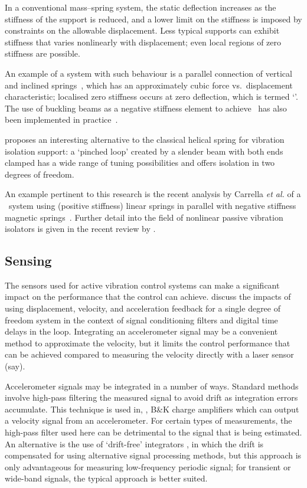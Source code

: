 In a conventional mass--spring system, the static deflection increases
as the stiffness of the support is reduced, and a lower limit on the
stiffness is imposed by constraints on the allowable
displacement. Less typical supports can exhibit stiffness that varies
nonlinearly with displacement; even local regions of zero stiffness
are possible.

An example of a system with such behaviour is a parallel
connection of vertical and inclined
springs~\cite{molyneux1957,alabuzhev1989,carrella2006,carrella2007},
which has an approximately cubic force vs.\ displacement
characteristic; localised zero stiffness occurs at zero deflection,
which is termed `\qzs'. The use of buckling beams as a negative
stiffness element to achieve \qzs\ has also been implemented in
practice~\cite{platus1999,tarnai2003}.

\textcite{virgin2008} proposes an interesting alternative to the
classical helical spring for vibration isolation support: a `pinched
loop' created by a slender beam with both ends clamped has a wide
range of tuning possibilities and offers isolation in two degrees of
freedom.

An example pertinent to this
research is the recent analysis by Carrella \emph{et al.} of a \qzs\
system using (positive stiffness) linear springs in parallel with negative
stiffness magnetic springs~\cite{carrella2008}. Further detail into the
field  of nonlinear passive vibration isolators is given in the recent
review by \textcite{ibrahim2008}.

\subsection{Sensing}

The sensors used for active vibration control systems can make a
significant impact on the performance that the control can
achieve. \textcite{brennan2007} discuss the impacts of using
displacement, velocity, and acceleration feedback for a single degree
of freedom system in the context of signal conditioning filters and
digital time delays in the loop. Integrating an accelerometer signal
may be a convenient method to approximate the velocity, but it limits
the control performance that can be achieved compared to measuring the
velocity directly with a laser sensor (say).

Accelerometer signals may be integrated in a number of ways. Standard methods
involve high-pass filtering the measured signal to avoid drift as integration
errors accumulate. This technique is used in, \eg, B\&K charge amplifiers
which can output a velocity signal from an accelerometer. For certain types of
measurements, the high-pass filter used here can be detrimental to the signal
that is being estimated. An alternative is the use of `drift-free' integrators
\cite{gavin1998}, in which the drift is compensated for using alternative
signal processing methods, but this approach is only advantageous for
measuring low-frequency periodic signal; for transient or wide-band signals,
the typical approach is better suited.

